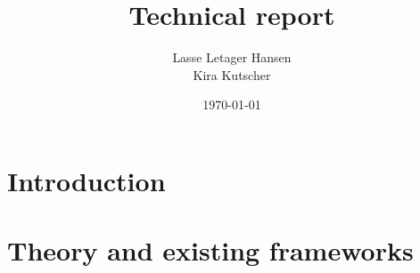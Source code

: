 \documentclass[11pt, leqno]{article}
\author{Lasse Letager Hansen %
  \\ Kira Kutscher %
}
\date{\today}
\title{Technical report}
\theoremstyle{definition}
\begin{document}

\newcommand\rml{$\mathcal{R}$\texttt{ml} } %
\newcommand\M{\texttt{M}} %


\maketitle

\tableofcontents
\newpage


\section{Introduction}



\section{Theory and existing frameworks}
\end{document}
